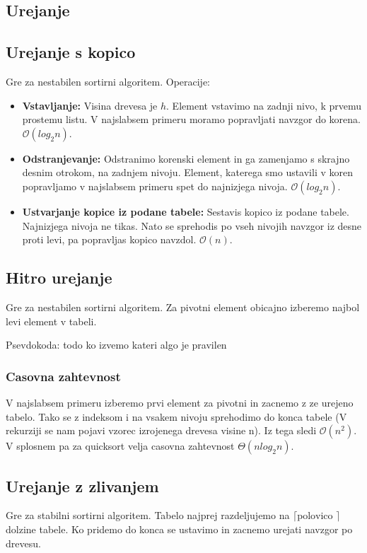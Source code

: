 \documentclass{article}
\begin{document}
\begin{multicols}{2}
\section{Urejanje}
\subsection{Urejanje s kopico}
Gre za nestabilen sortirni algoritem.
Operacije:
\begin{itemize}
    \item \textbf{Vstavljanje:} Visina drevesa je $h$. Element vstavimo na zadnji nivo, k prvemu prostemu listu. V najslabsem primeru moramo popravljati navzgor do korena. $\mathcal{O}(log_2 n)$.
    \item \textbf{Odstranjevanje: } Odstranimo korenski element in ga zamenjamo s skrajno desnim otrokom, na zadnjem nivoju. Element, katerega smo ustavili v koren popravljamo v najslabsem primeru spet do najnizjega nivoja. $\mathcal{O}(log_2 n)$.
    \item \textbf{Ustvarjanje kopice iz podane tabele:} Sestavis kopico iz podane tabele. Najnizjega nivoja ne tikas. Nato se sprehodis po vseh nivojih navzgor iz desne proti levi, pa popravljas kopico navzdol. $\mathcal{O}(n)$.
\end{itemize}
\subsection{Hitro urejanje}
Gre za nestabilen sortirni algoritem. Za pivotni element obicajno izberemo najbol levi element v tabeli.

Psevdokoda:
todo ko izvemo kateri algo je pravilen

\subsubsection{Casovna zahtevnost}
V najslabsem primeru izberemo prvi element za pivotni in zacnemo z ze urejeno tabelo. Tako se z indeksom i na vsakem nivoju sprehodimo do konca tabele (V rekurziji se nam pojavi vzorec izrojenega drevesa visine n). Iz tega sledi $\mathcal{O}(n^2)$. V splosnem pa za quicksort velja casovna zahtevnost $\Theta (nlog_2 n)$.

\subsection{Urejanje z zlivanjem}
Gre za stabilni sortirni algoritem.
Tabelo najprej razdeljujemo na $\lceil \text{polovico }\rceil$ dolzine tabele.
Ko pridemo do konca se ustavimo in zacnemo urejati navzgor po drevesu.


\end{multicols}
\end{document}
